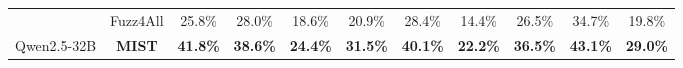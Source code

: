 \begin{table}[]
\begin{tabular}{c|c|ccc|ccc|ccc}
 & Fuzz4All & 25.8\% & 28.0\% & 18.6\% & 20.9\% & 28.4\% & 14.4\% &26.5\%  &34.7\%  & 19.8\% \\
\multirow{-2}{*}{Qwen2.5-32B} & \cellcolor[HTML]{ECF4FF}\textbf{MIST} & \cellcolor[HTML]{ECF4FF}\textbf{41.8\%} & \cellcolor[HTML]{ECF4FF}\textbf{38.6\%} & \cellcolor[HTML]{ECF4FF}\textbf{24.4\%} & \cellcolor[HTML]{ECF4FF}\textbf{31.5\%} & \cellcolor[HTML]{ECF4FF}\textbf{40.1\%} & \cellcolor[HTML]{ECF4FF}\textbf{22.2\%} & \cellcolor[HTML]{ECF4FF}\textbf{36.5\%} & \cellcolor[HTML]{ECF4FF}\textbf{43.1\%} & \cellcolor[HTML]{ECF4FF}\textbf{29.0\%} \\ \bottomrule
\end{tabular}
\end{table}